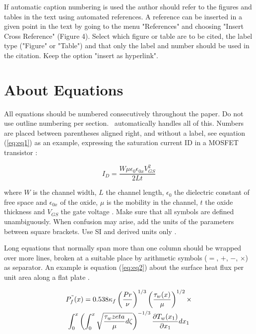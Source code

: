\documentclass[10pt]{style_src/imeko_acta}
\begin{document}
If automatic caption numbering is used the author should refer to the figures and tables in the text using automated references. A reference can be inserted in a given point in the text by going to the menu "References" and choosing "Insert Cross Reference" (Figure 4). Select which figure or table are to be cited, the label type ("Figure" or "Table") and that only the label and number should be used in the citation. Keep the option "insert as hyperlink". 

\section{About Equations}

All equations should be numbered consecutively throughout the paper. Do not use outline numbering per section. \LaTeXe\ automatically handles all of this. Numbers are placed between parentheses aligned right, and without a label, see equation (\ref{eq:eq1}) as an example, expressing the saturation current ID in a MOSFET transistor \cite{Middelhoek1989}:

\begin{equation}\label{eq:eq1}
I_D = \frac{W \mu \epsilon_0 \epsilon_{0x} V^2_{GS}}{2Lt}
\end{equation}

where $W$ is the channel width, $L$ the channel length, $\epsilon_0$ the dielectric constant of free space and $\epsilon_{0x}$ of the oxide, $\mu$ is the mobility in the channel, $t$ the oxide thickness and $V_{GS}$ the gate voltage \cite{Middelhoek1989}. Make sure that all symbols are defined unambiguously. When confusion may arise, add the units of the parameters between square brackets. Use SI and derived units only \cite{Grattan1994}. 

Long equations that normally span more than one column should be wrapped over more lines, broken at a suitable place by arithmetic symbols ($=$, $+$, $-$, $\times$) as separator. An example is equation  (\ref{eq:eq2}) about the surface heat flux per unit area along a flat plate \cite{Lighthill1950,Lighthill1950b}.

\begin{multline}\label{eq:eq2}
P^{"}_f(x) = 0.538\kappa_f \left(\frac{Pr}{\nu}\right)^{1/3}\left(\frac{\tau_w(x)}{\mu}\right)^{1/2} \times \\
\int_{0}^{x} \left(\int_{0}^{x}\sqrt{\frac{\tau_w{zeta}}{\mu}d\zeta} \right)^{-1/3} \frac{\partial T_w(x_1)}{\partial x_1}dx_1
\end{multline}
\end{document}

